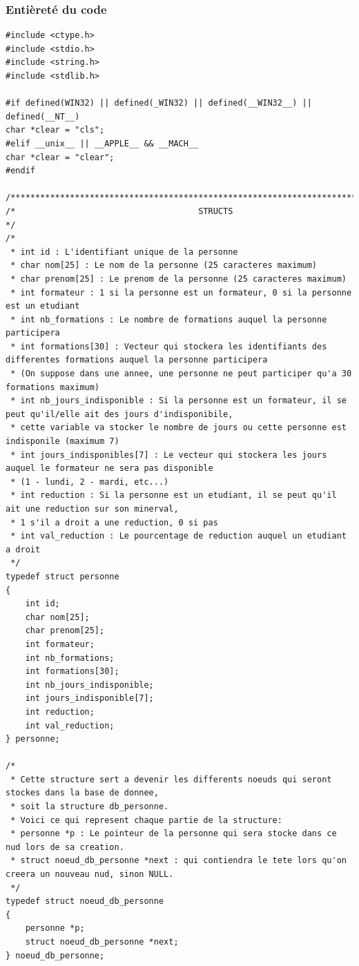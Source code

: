 \documentclass[11pt]{article}
\begin{document}
\subsubsection{Entièreté du code}
\begin{lstlisting}
#include <ctype.h>
#include <stdio.h>
#include <string.h>
#include <stdlib.h>

#if defined(WIN32) || defined(_WIN32) || defined(__WIN32__) || defined(__NT__)
char *clear = "cls";
#elif __unix__ || __APPLE__ && __MACH__
char *clear = "clear";
#endif

/*****************************************************************************/
/*                                     STRUCTS                               */
/*
 * int id : L'identifiant unique de la personne
 * char nom[25] : Le nom de la personne (25 caracteres maximum)
 * char prenom[25] : Le prenom de la personne (25 caracteres maximum)
 * int formateur : 1 si la personne est un formateur, 0 si la personne est un etudiant
 * int nb_formations : Le nombre de formations auquel la personne participera
 * int formations[30] : Vecteur qui stockera les identifiants des differentes formations auquel la personne participera
 * (On suppose dans une annee, une personne ne peut participer qu'a 30 formations maximum)
 * int nb_jours_indisponible : Si la personne est un formateur, il se peut qu'il/elle ait des jours d'indisponibile,
 * cette variable va stocker le nombre de jours ou cette personne est indisponile (maximum 7)
 * int jours_indisponibles[7] : Le vecteur qui stockera les jours auquel le formateur ne sera pas disponible
 * (1 - lundi, 2 - mardi, etc...)
 * int reduction : Si la personne est un etudiant, il se peut qu'il ait une reduction sur son minerval,
 * 1 s'il a droit a une reduction, 0 si pas
 * int val_reduction : Le pourcentage de reduction auquel un etudiant a droit
 */
typedef struct personne
{
    int id;
    char nom[25];
    char prenom[25];
    int formateur;
    int nb_formations;
    int formations[30];
    int nb_jours_indisponible;
    int jours_indisponible[7];
    int reduction;
    int val_reduction;
} personne;

/*
 * Cette structure sert a devenir les differents noeuds qui seront stockes dans la base de donnee,
 * soit la structure db_personne.
 * Voici ce qui represent chaque partie de la structure:
 * personne *p : Le pointeur de la personne qui sera stocke dans ce nud lors de sa creation.
 * struct noeud_db_personne *next : qui contiendra le tete lors qu'on creera un nouveau nud, sinon NULL.
 */
typedef struct noeud_db_personne
{
    personne *p;
    struct noeud_db_personne *next;
} noeud_db_personne;


\end{lstlisting}
\end{document}
